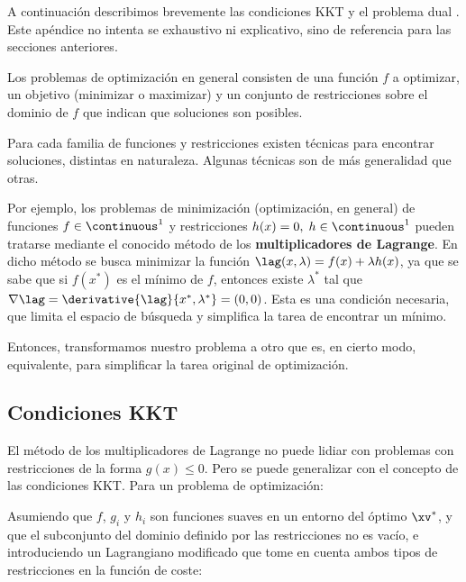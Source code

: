 
A continuación describimos brevemente las condiciones KKT y el problema dual \cite{boyd2004}. Este apéndice no intenta se exhaustivo ni explicativo, sino de referencia para las secciones anteriores.


Los problemas de optimización en general consisten de una función $f$ a optimizar, un objetivo (minimizar o maximizar) y un conjunto de restricciones sobre el dominio de $f$ que indican que soluciones son posibles.



Para cada familia de funciones y restricciones existen técnicas para encontrar soluciones, distintas en naturaleza. Algunas técnicas son de más generalidad que otras.

Por ejemplo, los problemas de minimización (optimización, en general) de funciones $f \in \continuous^1$ y restricciones $h(x)=0, \; h \in \continuous^1$ pueden tratarse mediante el conocido método de los \textbf{multiplicadores de Lagrange}. En dicho método se busca minimizar la función $\lag(x,\lambda) = f(x) + \lambda h(x)$, ya que se sabe que si  $f(x^*)$ es el mínimo de $f$, entonces existe $\lambda^*$ tal que $\nabla \lag = \derivative{\lag}{x^*,\lambda^*} = (0,0)$. Esta es una condición necesaria, que limita el espacio de búsqueda y simplifica la tarea de encontrar un mínimo.

Entonces, transformamos nuestro problema a otro que es, en cierto modo, equivalente, para simplificar la tarea original de optimización.


\subsection{Condiciones KKT}

El método de los multiplicadores de Lagrange no puede lidiar con problemas con restricciones de la forma $g(x) \leq 0$. Pero se puede generalizar con el concepto de  las condiciones KKT. Para un problema de optimización:


Asumiendo que $f$, $g_i$ y $h_i$ son funciones suaves en un entorno del óptimo $\xv^*$, y que el subconjunto del dominio definido por las restricciones no es vacío, e introduciendo un Lagrangiano modificado que tome en cuenta ambos tipos de restricciones en la función de coste:

